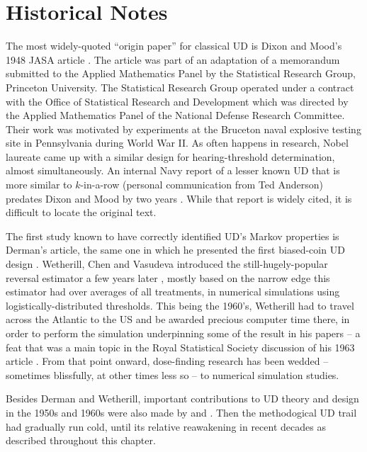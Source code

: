 \section{Historical Notes}\label{sec:history}

The most widely-quoted ``origin paper'' for classical UD is Dixon and Mood's 1948 JASA article \citep{Dixo:Mood:Amet:1948}. The article was part of an adaptation of a memorandum submitted to the Applied Mathematics Panel by the Statistical Research Group, Princeton University.  The Statistical Research Group operated under a contract with the Office of Statistical Research and Development which was directed by the Applied Mathematics Panel of the National Defense Research Committee.  Their work was motivated by experiments at the Bruceton naval explosive testing site in Pennsylvania during World War II. As often happens in research, Nobel laureate \citep{vonB:anew:1947} came up with a similar design for hearing-threshold determination, almost simultaneously.  An internal Navy report of a lesser known UD that is more similar to $k$-in-a-row (personal communication from Ted Anderson) predates Dixon and Mood by two years  \citep{Ande:McCa:Tuke:Stai:1946}. While that report is widely cited, it is difficult to locate the original text.

The first study known to have correctly identified UD's Markov properties is Derman's article, the same one in which he presented the first biased-coin UD design \citep{Derm:Nonp:1957}. Wetherill, Chen and Vasudeva introduced the still-hugely-popular reversal estimator a few years later \citep{Weth:Chen:Vasu:est:1966}, mostly based on the narrow edge this estimator had over averages of all treatments, in numerical simulations using logistically-distributed thresholds. This being the 1960's, Wetherill had to travel across the Atlantic to the US and be awarded precious computer time there, in order to perform the simulation underpinning some of the result in his papers -- a feat that was a main topic in the Royal Statistical Society discussion of his 1963 article \citep{Weth:Sequ:1963}. From that point onward, dose-finding research has been wedded -- sometimes blissfully, at other times less so -- to numerical simulation studies.

Besides Derman and Wetherill, important contributions to UD theory and design in the 1950s and 1960s were also made by \cite{BrownleeEtAl53} and \cite{Tsut:asym:1967,Tsut:rand:1967}. Then the methodogical UD trail had gradually run cold, until its relative reawakening in recent decades as described throughout this chapter.

